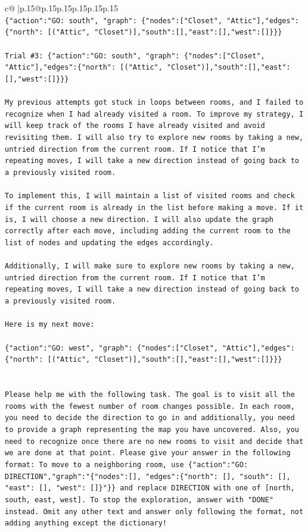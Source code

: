 \documentclass{article}
\begin{document}
{\begin{supertabular}{c@{$\;$}|p{.15\linewidth}@{}p{.15\linewidth}p{.15\linewidth}p{.15\linewidth}p{.15\linewidth}p{.15\linewidth}}
{{{\\ 
\texttt{\{"action":"GO: south", "graph": \{"nodes":{[}"Closet", "Attic"{]},"edges":\{"north": {[}("Attic", "Closet"){]},"south":{[}{]},"east":{[}{]},"west":{[}{]}\}\}\}} \\
\\ 
\texttt{Trial \#3: \{"action":"GO: south", "graph": \{"nodes":{[}"Closet", "Attic"{]},"edges":\{"north": {[}("Attic", "Closet"){]},"south":{[}{]},"east":{[}{]},"west":{[}{]}\}\}\}} \\
\\ 
\texttt{My previous attempts got stuck in loops between rooms, and I failed to recognize when I had already visited a room. To improve my strategy, I will keep track of the rooms I have already visited and avoid revisiting them. I will also try to explore new rooms by taking a new, untried direction from the current room. If I notice that I'm repeating moves, I will take a new direction instead of going back to a previously visited room.} \\
\\ 
\texttt{To implement this, I will maintain a list of visited rooms and check if the current room is already in the list before making a move. If it is, I will choose a new direction. I will also update the graph correctly after each move, including adding the current room to the list of nodes and updating the edges accordingly.} \\
\\ 
\texttt{Additionally, I will make sure to explore new rooms by taking a new, untried direction from the current room. If I notice that I'm repeating moves, I will take a new direction instead of going back to a previously visited room.} \\
\\ 
\texttt{Here is my next move:} \\
\\ 
\texttt{\{"action":"GO: west", "graph": \{"nodes":{[}"Closet", "Attic"{]},"edges":\{"north": {[}("Attic", "Closet"){]},"south":{[}{]},"east":{[}{]},"west":{[}{]}\}\}\}} \\
\\ 
\\ 
\texttt{Please help me with the following task. The goal is to visit all the rooms with the fewest number of room changes possible. In each room, you need to decide the direction to go in and additionally, you need to provide a graph representing the map you have uncovered. Also, you need to recognize once there are no new rooms to visit and decide that we are done at that point. Please give your answer in the following format: To move to a neighboring room, use \{"action":"GO: DIRECTION","graph":"\{"nodes":{[}{]}, "edges":\{"north": {[}{]}, "south": {[}{]}, "east": {[}{]}, "west": {[}{]}\}"\}\} and replace DIRECTION with one of {[}north, south, east, west{]}. To stop the exploration, answer with "DONE" instead. Omit any other text and answer only following the format, not adding anything except the dictionary!} \\
}}}
\end{supertabular}}
\end{document}
